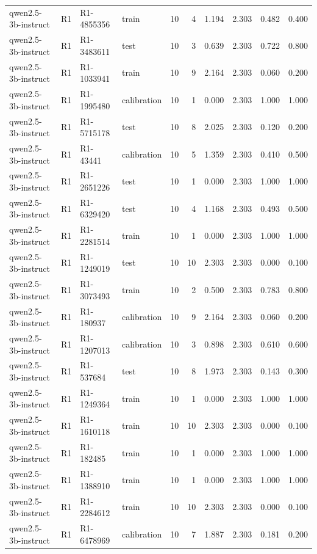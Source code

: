 \begin{table}
\begin{tabular}{llllrrrrrr}
qwen2.5-3b-instruct & R1 & R1-4855356 & train & 10 & 4 & 1.194 & 2.303 & 0.482 & 0.400 \\
qwen2.5-3b-instruct & R1 & R1-3483611 & test & 10 & 3 & 0.639 & 2.303 & 0.722 & 0.800 \\
qwen2.5-3b-instruct & R1 & R1-1033941 & train & 10 & 9 & 2.164 & 2.303 & 0.060 & 0.200 \\
qwen2.5-3b-instruct & R1 & R1-1995480 & calibration & 10 & 1 & 0.000 & 2.303 & 1.000 & 1.000 \\
qwen2.5-3b-instruct & R1 & R1-5715178 & test & 10 & 8 & 2.025 & 2.303 & 0.120 & 0.200 \\
qwen2.5-3b-instruct & R1 & R1-43441 & calibration & 10 & 5 & 1.359 & 2.303 & 0.410 & 0.500 \\
qwen2.5-3b-instruct & R1 & R1-2651226 & test & 10 & 1 & 0.000 & 2.303 & 1.000 & 1.000 \\
qwen2.5-3b-instruct & R1 & R1-6329420 & test & 10 & 4 & 1.168 & 2.303 & 0.493 & 0.500 \\
qwen2.5-3b-instruct & R1 & R1-2281514 & train & 10 & 1 & 0.000 & 2.303 & 1.000 & 1.000 \\
qwen2.5-3b-instruct & R1 & R1-1249019 & test & 10 & 10 & 2.303 & 2.303 & 0.000 & 0.100 \\
qwen2.5-3b-instruct & R1 & R1-3073493 & train & 10 & 2 & 0.500 & 2.303 & 0.783 & 0.800 \\
qwen2.5-3b-instruct & R1 & R1-180937 & calibration & 10 & 9 & 2.164 & 2.303 & 0.060 & 0.200 \\
qwen2.5-3b-instruct & R1 & R1-1207013 & calibration & 10 & 3 & 0.898 & 2.303 & 0.610 & 0.600 \\
qwen2.5-3b-instruct & R1 & R1-537684 & test & 10 & 8 & 1.973 & 2.303 & 0.143 & 0.300 \\
qwen2.5-3b-instruct & R1 & R1-1249364 & train & 10 & 1 & 0.000 & 2.303 & 1.000 & 1.000 \\
qwen2.5-3b-instruct & R1 & R1-1610118 & train & 10 & 10 & 2.303 & 2.303 & 0.000 & 0.100 \\
qwen2.5-3b-instruct & R1 & R1-182485 & train & 10 & 1 & 0.000 & 2.303 & 1.000 & 1.000 \\
qwen2.5-3b-instruct & R1 & R1-1388910 & train & 10 & 1 & 0.000 & 2.303 & 1.000 & 1.000 \\
qwen2.5-3b-instruct & R1 & R1-2284612 & train & 10 & 10 & 2.303 & 2.303 & 0.000 & 0.100 \\
qwen2.5-3b-instruct & R1 & R1-6478969 & calibration & 10 & 7 & 1.887 & 2.303 & 0.181 & 0.200 \\

\end{tabular}
\end{table}
